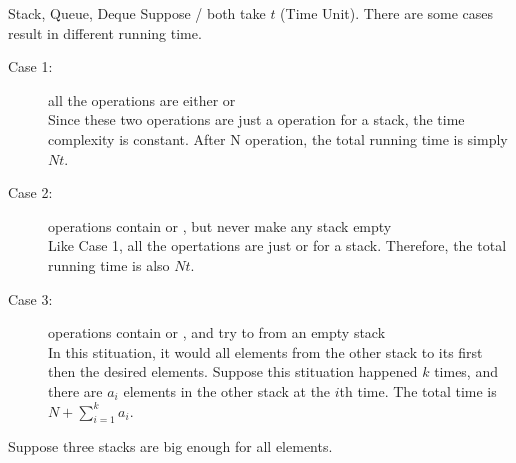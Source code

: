 \begin{homeworkProblem}{Stack, Queue, Deque}
    Suppose / both take $t$ (Time Unit).
    There are some cases result in different running time.
    \begin{description}
    \item[Case 1:] all the operations are either  or  \\
        Since these two operations are just a  operation for a stack, the 
        time complexity is constant. After N operation, the total running time is 
        simply $Nt$.
    \item[Case 2:] operations contain  or , but never make
        any stack empty \\
        Like Case 1, all the opertations are just  or  for a stack.
        Therefore, the total running time is also $Nt$.
    \item[Case 3:] operations contain  or , and try to 
        from an empty stack \\
        In this stituation, it would  all elements from the other stack to its 
        first then  the desired elements. Suppose this stituation happened $k$
        times, and there are $a_i$ elements in the other stack at the $i$th time.
        The total time is $N + \sum\limits_{i=1}^k a_i $.

    \end{description}


    \pagebreak
    
    Suppose three stacks are big enough for all elements.

    \begin{figure}[h!]
        \centering
\end{figure}
\end{homeworkProblem}
